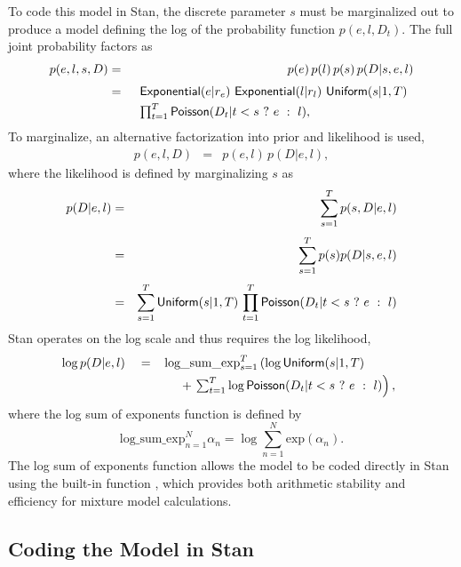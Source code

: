 To code this model in Stan, the discrete parameter $s$ must be
marginalized out to produce a model defining the log of the
probability function $p(e,l,D_t)$.  The full joint probability factors
as 
%
\begin{eqnarray*}
p(e,l,s,D)
& = & p(e) \, p(l) \, p(s) \, p(D | s, e, l)
\\[3pt]
& = & 
\begin{array}[t]{l}
\distro{Exponential}(e|r_e) \ \distro{Exponential}(l|r_l) \
\distro{Uniform}(s|1, T)
\\[3pt]
\prod_{t=1}^T \distro{Poisson}(D_t | t < s \ ? \ e \ : \ l),
\end{array}
\end{eqnarray*}
%
To marginalize, an alternative factorization into prior and likelihood
is used,
%
\begin{eqnarray*}
p(e,l,D) & = & p(e,l) \, p(D|e,l),
\end{eqnarray*}
%
where the likelihood is defined by marginalizing $s$ as
%
\begin{eqnarray*}
p(D | e,l) 
& = &
\sum_{s=1}^T p(s, D | e,l)
\\[3pt]
& = &
\sum_{s=1}^T p(s) p(D | s,e,l)
\\[3pt]
& = &
\sum_{s=1}^T \distro{Uniform}(s | 1,T) 
\, \prod_{t=1}^T \distro{Poisson}(D_t | t < s \ ? \ e \ : \ l)
\end{eqnarray*}
%
Stan operates on the log scale and thus requires the log likelihood,
%
\[
\log p(D | e,l)
\\[3pt]
\mbox{ } \ \ = \
\begin{array}[t]{l}
\mbox{log\_sum\_exp}_{s=1}^T 
\left( \log \distro{Uniform}(s | 1,T) \right.
\\[3pt]
{} \hspace*{12pt} + \left. \sum_{t=1}^T \log \distro{Poisson}(D_t | t < s \ ?
\ e \ : \ l) \right),
\end{array}
\]
%
where the log sum of exponents function is defined by
\[
\mbox{log\_sum\_exp}_{n=1}^N \alpha_n
=
\log \sum_{n=1}^N \mbox{exp}(\alpha_n).
\]
%
The log sum of exponents function allows the model to be coded
directly in Stan using the built-in function ,
which provides both arithmetic stability and efficiency for mixture
model calculations.


\subsection{Coding the Model in Stan}

